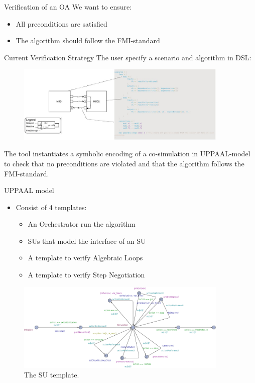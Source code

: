 \documentclass{beamer}
\begin{document}
\begin{frame}{Verification of an OA}
    We want to ensure:
    \begin{itemize}
        \item All preconditions are satisfied
        \item The algorithm should follow the FMI-standard
    \end{itemize}
\end{frame}

\begin{frame}{Current Verification Strategy}
    The user specify a scenario and algorithm in DSL: 
    \begin{figure}    
        \centering
        \includegraphics[width=0.9\textwidth]{images/scenario-generation.jpg}
    \end{figure}
    The tool instantiates a symbolic encoding of a co-simulation in UPPAAL-model to check that no preconditions are violated and that the algorithm follows the FMI-standard.
\end{frame}

\begin{frame}{UPPAAL model}
    \begin{itemize}
        \item Consist of 4 templates:
        \begin{itemize}
            \item An Orchestrator run the algorithm
            \item SUs that model the interface of an SU
            \item A template to verify Algebraic Loops
            \item A template to verify Step Negotiation
        \end{itemize}
    \end{itemize}
    \begin{figure}
        \includegraphics[width=0.9\textwidth]{images/SU_snippet.pdf}
        \caption{The SU template.}
    \end{figure}
\end{frame}
\end{document}
